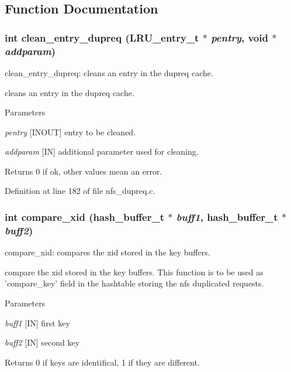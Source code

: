 \subsection{Function Documentation}
\subsubsection[{clean\_\-entry\_\-dupreq}]{\setlength{\rightskip}{0pt plus 5cm}int clean\_\-entry\_\-dupreq (LRU\_\-entry\_\-t $\ast$ {\em pentry}, \/  void $\ast$ {\em addparam})}\label{nfs__dupreq_8c_a0dd9a264f91e9823e807b34e6994f777}
clean\_\-entry\_\-dupreq: cleans an entry in the dupreq cache.

cleans an entry in the dupreq cache.


\begin{DoxyParams}{Parameters}
\item[{\em pentry}][INOUT] entry to be cleaned. \item[{\em addparam}][IN] additional parameter used for cleaning.\end{DoxyParams}
\begin{DoxyReturn}{Returns}
0 if ok, other values mean an error. 
\end{DoxyReturn}


Definition at line 182 of file nfs\_\-dupreq.c.
\subsubsection[{compare\_\-xid}]{\setlength{\rightskip}{0pt plus 5cm}int compare\_\-xid (hash\_\-buffer\_\-t $\ast$ {\em buff1}, \/  hash\_\-buffer\_\-t $\ast$ {\em buff2})}\label{nfs__dupreq_8c_a1754ccd21821c745e816f32a7a459e24}
compare\_\-xid: compares the xid stored in the key buffers.

compare the xid stored in the key buffers. This function is to be used as 'compare\_\-key' field in the hashtable storing the nfs duplicated requests.


\begin{DoxyParams}{Parameters}
\item[{\em buff1}][IN] first key \item[{\em buff2}][IN] second key\end{DoxyParams}
\begin{DoxyReturn}{Returns}
0 if keys are identifical, 1 if they are different. 
\end{DoxyReturn}


